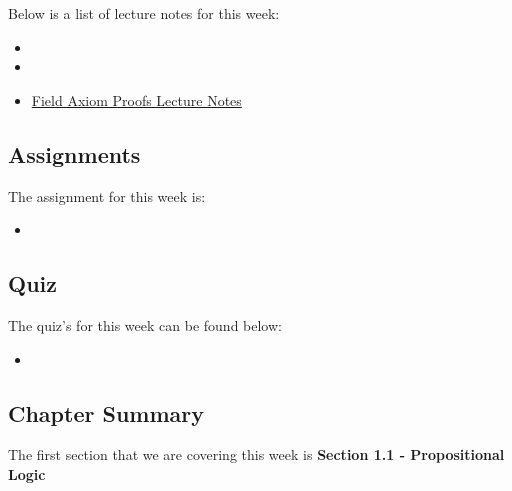 \noindent Below is a list of lecture notes for this week:

\begin{itemize}
    \item {}
    \item {}
    \item \href{https://www.stumblingrobot.com/2015/06/29/prove-consequences-of-the-field-axioms/}{Field Axiom Proofs Lecture Notes}
\end{itemize}

\subsection{Assignments}

The assignment for this week is:

\begin{itemize}
    \item {}
\end{itemize}

\subsection{Quiz}

The quiz's for this week can be found below:

\begin{itemize}
    \item {}
\end{itemize}

\subsection{Chapter Summary}

The first section that we are covering this week is \textbf{Section 1.1 - Propositional Logic}

